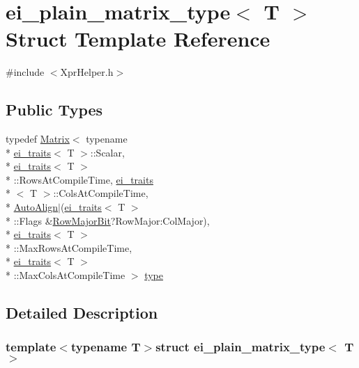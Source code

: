 \hypertarget{structei__plain__matrix__type}{\section{ei\-\_\-plain\-\_\-matrix\-\_\-type$<$ T $>$ Struct Template Reference}
\label{structei__plain__matrix__type}
}


{\ttfamily \#include $<$Xpr\-Helper.\-h$>$}

\subsection*{Public Types}
\begin{DoxyCompactItemize}
\item 
typedef \hyperlink{class_matrix}{Matrix}$<$ typename \\*
\hyperlink{structei__traits}{ei\-\_\-traits}$<$ T $>$\-::Scalar, \\*
\hyperlink{structei__traits}{ei\-\_\-traits}$<$ T $>$\\*
\-::Rows\-At\-Compile\-Time, \hyperlink{structei__traits}{ei\-\_\-traits}\\*
$<$ T $>$\-::Cols\-At\-Compile\-Time, \\*
\hyperlink{_constants_8h_a4d29ca5db06e2ae647d1ec22548a9d2aa02a97bb4792f98916a1156a521fa9813}{Auto\-Align}$|$(\hyperlink{structei__traits}{ei\-\_\-traits}$<$ T $>$\\*
\-::Flags \&\hyperlink{group__flags_ga7bd49e7b260e869e10fb9dc4fd081a85}{Row\-Major\-Bit}?Row\-Major\-:\-Col\-Major), \\*
\hyperlink{structei__traits}{ei\-\_\-traits}$<$ T $>$\\*
\-::Max\-Rows\-At\-Compile\-Time, \\*
\hyperlink{structei__traits}{ei\-\_\-traits}$<$ T $>$\\*
\-::Max\-Cols\-At\-Compile\-Time $>$ \hyperlink{structei__plain__matrix__type_a3178ccba5bcd15a2c6e295d3cd2527a8}{type}
\end{DoxyCompactItemize}


\subsection{Detailed Description}
\subsubsection*{template$<$typename T$>$struct ei\-\_\-plain\-\_\-matrix\-\_\-type$<$ T $>$}



